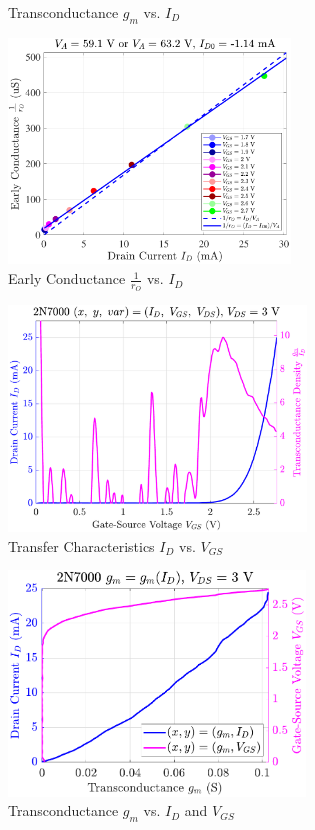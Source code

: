 \documentclass[UTF8]{article}
\begin{document}
\begin{center}
\begin{minipage}{0.45\columnwidth}
\begin{figure}[H]
        \caption{Transconductance $g_m$ vs. $I_D$}
    \end{figure}
\end{minipage}\hfill\begin{minipage}{0.45\columnwidth}
    \begin{figure}[H]\centering
        \includegraphics[height=170pt]{LCE-04-场效应管/assets/2N7000/2N7000 (NMOS) [onsemi, KH32] current level mid (0~25mA)/2025-04-24_00-04-24__stc_rO_Id_Vgs.pdf}
        \caption{Early Conductance $\frac{1}{r_O}$ vs. $I_D$}
    \end{figure}
    \begin{figure}[H]\centering
        \includegraphics[height=170pt]{LCE-04-场效应管/assets/2N7000/2N7000 (NMOS) [onsemi, KH32] current level mid (0~25mA)/2025-04-24_00-04-28__stc_Id_Vgs_Vds.pdf}
        \caption{Transfer Characteristics $I_D$ vs. $V_{GS}$}
    \end{figure}
    \begin{figure}[H]\centering
        \includegraphics[height=170pt]{LCE-04-场效应管/assets/2N7000/2N7000 (NMOS) [onsemi, KH32] current level mid (0~25mA)/2025-04-24_00-04-31__stc_gm_IdVgs_yyplot.pdf}
        \caption{Transconductance $g_m$ vs. $I_D$ and $V_{GS}$}
    \end{figure}
\end{minipage}\end{center}
\end{document}
